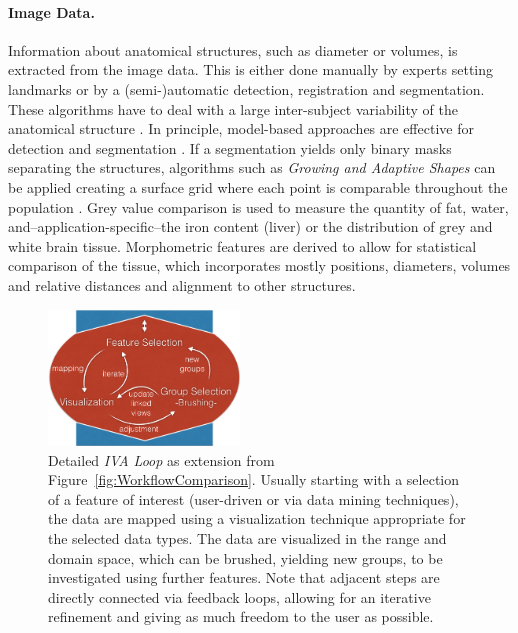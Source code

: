 \documentclass[journal]{style/vgtc} 			          %
\begin{document}
\paragraph{Image Data. }
Information about anatomical structures, such as diameter or volumes, is extracted from the image data.
%
This is either done manually by experts setting landmarks or by a (semi-)automatic detection, registration and segmentation.
%
These algorithms have to deal with a large inter-subject variability of the anatomical structure \cite{Preim2014}.
%
In principle, model-based approaches are effective for detection \cite{Rak2013} and segmentation \cite{Gloger2010}. %
%
If a segmentation yields only binary masks separating the structures, algorithms such as \emph{Growing and Adaptive Shapes} can be applied creating a surface grid where each point is comparable throughout the population \cite{Ferrarini2007}.
%
Grey value comparison is used to measure the quantity of fat, water, and--application-specific--the iron content (liver) or the distribution of grey and white brain tissue.
%
Morphometric features are derived to allow for statistical comparison of the tissue, which incorporates mostly positions, diameters, volumes and relative distances and alignment to other structures.
\begin{figure}[htb]
 \centering
 \includegraphics[width=2.0in]{figures/InteractionLoop}
 \caption{Detailed \emph{IVA Loop} as extension from Figure~\ref{fig:WorkflowComparison}.
 Usually starting with a selection of a feature of interest (user-driven or via data mining techniques), the data are mapped using a visualization technique appropriate for the selected data types.
 The data are visualized in the range and domain space, which can be brushed, yielding new groups, to be investigated using further features.
 Note that adjacent steps are directly connected via feedback loops, allowing for an iterative refinement and giving as much freedom to the user as possible.}
 \label{fig:InteractionLoop}
\end{figure}
\end{document}
